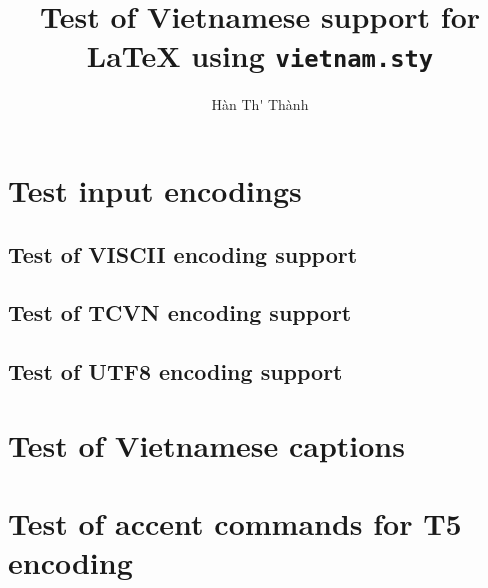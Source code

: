 \documentclass[openany]{book}
\begin{document}
\title{\bfseries Test of Vietnamese support for \LaTeX{} using \texttt{vietnam.sty}}
\author{H\`an Th\'\ecircumflex{} Th\`anh}
\maketitle

\tableofcontents
\listoffigures

\chapter{Test input encodings}
\section{Test of VISCII encoding support}


\section{Test of TCVN encoding support}


\section{Test of UTF8 encoding support}



\clearpage

\appendix

\chapter{Test of Vietnamese captions}


\chapter{Test of accent commands for T5 encoding}

\end{document}

